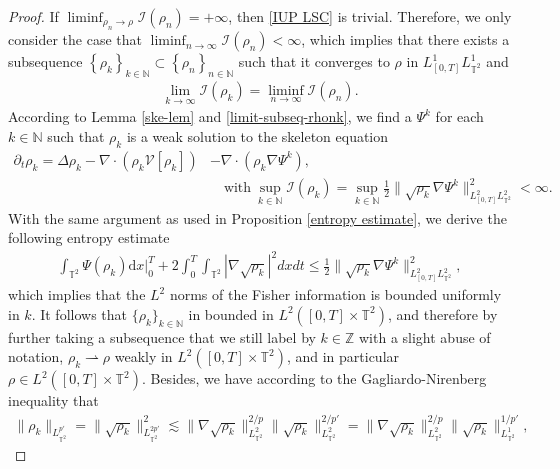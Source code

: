 \begin{proof}
    If $\liminf_{\rho_n\rightarrow \rho}\mathcal{I}(\rho_n)=+\infty$, then \eqref{IUP LSC} is trivial. Therefore, we only consider the case that
$\liminf_{n \to \infty}\mathcal{I}(\rho_n)<\infty$, which implies that there exists a subsequence $\left\{\rho_{k}\right\}_{k\in \mathbb{N}} \subset \left\{\rho_{n}\right\}_{n\in \mathbb{N}}$ such that it converges to $\rho$ in  $ L^1_{[0,T]}L^1_{\mathbb{T}^2}$ and
\begin{align}\label{limit-subseq-rhonk}
   \lim_{k \rightarrow\infty}\mathcal{I}(\rho_{k})=\liminf_{n \rightarrow \infty}\mathcal{I}(\rho_n). 
\end{align}
According to Lemma \ref{ske-lem} and \eqref{limit-subseq-rhonk}, we find a $\Psi^{k}$ for each $k \in \mathbb{N}$ such that $\rho_{k}$ is a weak solution to the skeleton equation
\begin{align*}
\partial_t\rho_{k}=\Delta\rho_{k}-\nabla\cdot(\rho_{k} \mathcal{V}[\rho_{k}]) & - \nabla\cdot(\rho_{k}\nabla\Psi^{k}), \\ & \quad \text{with} \ \sup_{k \in \mathbb{N}}\mathcal{I}(\rho_{k})=\sup_{k \in \mathbb{N}}\frac{1}{2}\|\sqrt{\rho_{k}}\nabla\Psi^{k}\|_{L^2_{[0,T]}L^2_{\mathbb{T}^2}}^2 < \infty.
\end{align*}
With the same argument as used in Proposition \ref{entropy estimate}, we derive the following entropy estimate
\begin{align}\label{SK EE}
\int_{\mathbb{T}^2}\Psi(\rho_k)\mathrm{d}x \Big|_0^T+2\int_0^T\int_{\mathbb{T}^2}|\nabla\sqrt{\rho_k}|^2{d}x{d}t
\leq \frac{1}{2}\|\sqrt{\rho_{k}}\nabla\Psi^{k}\|_{L^2_{[0,T]}L^2_{\mathbb{T}^2}}^2,
\end{align}
which implies that the $L^2$ norms of the Fisher information is bounded uniformly in $k$. It follows that $\{\rho_k\}_{k \in \mathbb{N}}$ in bounded in $L^2([0,T] \times \mathbb{T}^2)$, and therefore by further taking a subsequence that we still label by $k \in \mathbb{Z}$ with  a slight abuse of notation, $\rho_k \rightharpoonup \rho$ weakly in $L^2([0,T] \times \mathbb{T}^2)$, and in particular $\rho \in L^2([0,T] \times \mathbb{T}^2)$. Besides, we have according to the Gagliardo-Nirenberg inequality that 
\begin{align}\label{eq:Lp'-solution}
\|\rho_k\|_{L^{p'}_{\mathbb{T}^2}} = \|\sqrt{\rho_k}\|^2_{L_{\mathbb{T}^2}^{2p'}} \lesssim  \| \nabla \sqrt{\rho_k}\|^{2/p}_{L_{\mathbb{T}^2}^{2}} \|\sqrt{\rho_k}\|^{2/p'}_{L_{\mathbb{T}^2}^{2}} = \| \nabla \sqrt{\rho_k}\|^{2/p}_{L_{\mathbb{T}^2}^{2}} \|\sqrt{\rho_k}\|^{1/p'}_{L_{\mathbb{T}^2}^{1}},

\end{align}
\end{proof}

